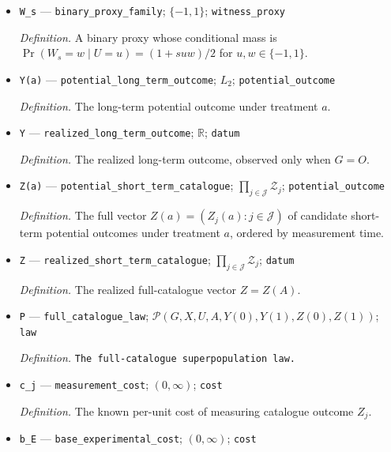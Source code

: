 \documentclass{article}
\begin{document}
\begin{itemize}
  \par\smallskip\noindent\emph{Definition.} A generic signal strength for a binary proxy of \(U\).
  \item \texttt{W\_\allowbreak{}s} --- \texttt{binary\_\allowbreak{}proxy\_\allowbreak{}family}; \(\{-1,1\}\); \texttt{witness\_\allowbreak{}proxy}
  \par\smallskip\noindent\emph{Definition.} A binary proxy whose conditional mass is \(\Pr(W_s=w\mid U=u)=(1+suw)/2\) for \(u,w\in\{-1,1\}\).
  \item \texttt{Y(a)} --- \texttt{potential\_\allowbreak{}long\_\allowbreak{}term\_\allowbreak{}outcome}; \(L_2\); \texttt{potential\_\allowbreak{}outcome}
  \par\smallskip\noindent\emph{Definition.} The long-term potential outcome under treatment \(a\).
  \item \texttt{Y} --- \texttt{realized\_\allowbreak{}long\_\allowbreak{}term\_\allowbreak{}outcome}; \(\mathbb R\); \texttt{datum}
  \par\smallskip\noindent\emph{Definition.} The realized long-term outcome, observed only when \(G=O\).
  \item \texttt{Z(a)} --- \texttt{potential\_\allowbreak{}short\_\allowbreak{}term\_\allowbreak{}catalogue}; \(\prod_{j\in\mathcal J}\mathcal Z_j\); \texttt{potential\_\allowbreak{}outcome}
  \par\smallskip\noindent\emph{Definition.} The full vector \(Z(a)=(Z_j(a):j\in\mathcal J)\) of candidate short-term potential outcomes under treatment \(a\), ordered by measurement time.
  \item \texttt{Z} --- \texttt{realized\_\allowbreak{}short\_\allowbreak{}term\_\allowbreak{}catalogue}; \(\prod_{j\in\mathcal J}\mathcal Z_j\); \texttt{datum}
  \par\smallskip\noindent\emph{Definition.} The realized full-catalogue vector \(Z=Z(A)\).
  \item \texttt{P} --- \texttt{full\_\allowbreak{}catalogue\_\allowbreak{}law}; \(\mathcal P(G,X,U,A,Y(0),Y(1),Z(0),Z(1))\); \texttt{law}
  \par\smallskip\noindent\emph{Definition.} \texttt{The full-\allowbreak{}catalogue superpopulation law.}
  \item \texttt{c\_\allowbreak{}j} --- \texttt{measurement\_\allowbreak{}cost}; \((0,\infty)\); \texttt{cost}
  \par\smallskip\noindent\emph{Definition.} The known per-unit cost of measuring catalogue outcome \(Z_j\).
  \item \texttt{b\_\allowbreak{}E} --- \texttt{base\_\allowbreak{}experimental\_\allowbreak{}cost}; \((0,\infty)\); \texttt{cost}

\end{itemize}
\end{document}
